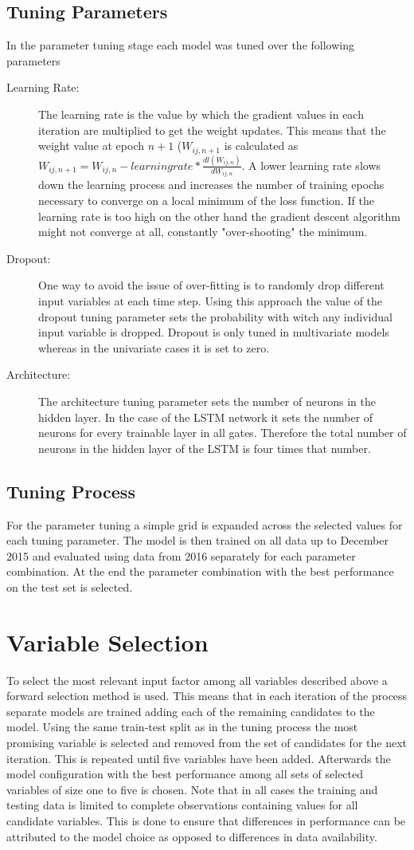 \subsection{Tuning Parameters}
In the parameter tuning stage each model was tuned over the following parameters
\begin{description}
\item[Learning Rate:] The learning rate is the value by which the gradient values in each iteration are multiplied to get the weight updates. This means that the weight value at epoch $n+1$ ($W_{ij, n+1}$ is calculated as $W_{ij, n+1} = W_{ij, n} - learningrate * \frac{dl(W_{ij, n})}{dW_{ij, n}}$. A lower learning rate slows down the learning process and increases the number of training epochs necessary to converge on a local minimum of the loss function. If the learning rate is too high on the other hand the gradient descent algorithm might not converge at all, constantly "over-shooting" the minimum.
\item[Dropout:] One way to avoid the issue of over-fitting is to randomly drop different input variables at each time step. Using this approach the value of the dropout tuning parameter sets the probability with witch any individual input variable is dropped. Dropout is only tuned in multivariate models whereas in the univariate cases it is set to zero.
\item[Architecture:] The architecture tuning parameter sets the number of neurons in the hidden layer. In the case of the LSTM network it sets the number of neurons for every trainable layer in all gates. Therefore the total number of neurons in the hidden layer of the LSTM is four times that number.
\end{description}
\subsection{Tuning Process}
For the parameter tuning a simple grid is expanded across the selected values for each tuning parameter. The model is then trained on all data up to December 2015 and evaluated using data from 2016 separately for each parameter combination. At the end the parameter combination with the best performance on the test set is selected.
\section{Variable Selection}
To select the most relevant input factor among all variables described above a forward selection method is used. This means that in each iteration of the process separate models are trained adding each of the remaining candidates to the model. Using the same train-test split as in the tuning process the most promising variable is  selected and removed from the set of candidates for the next iteration. This is repeated until five variables have been added. Afterwards the model configuration with the best performance among all sets of selected variables of size one to five is chosen. Note that in all cases the training and testing data is limited to complete observations containing values for all candidate variables. This is done to ensure that differences in performance can be attributed to the model choice as opposed to differences in data availability.
